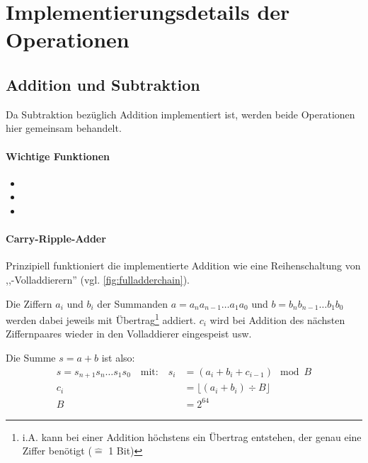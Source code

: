 
\section{Implementierungsdetails der Operationen} \label{sec:impldetails}
\subsection{Addition und Subtraktion}
    Da Subtraktion bezüglich Addition implementiert ist, werden beide Operationen hier gemeinsam behandelt.

    \paragraph*{Wichtige Funktionen}
        \begin{itemize} \tightlist
            \item {}
            \item {}
            \item {}
        \end{itemize}

    \paragraph*{Carry-Ripple-Adder}
        Prinzipiell funktioniert die implementierte Addition wie eine Reihenschaltung von ,,-Volladdierern'' (vgl. \autoref{fig:fulladderchain}).

        Die Ziffern $a_i$ und $b_i$ der Summanden $a=a_{n}a_{n-1}\dots{}a_{1}a_{0}$ und $b=b_{n}b_{n-1}\dots{}b_{1}b_{0}$ werden dabei jeweils mit Übertrag\footnote{i.A. kann bei einer Addition höchstens ein Übertrag entstehen, der genau eine Ziffer benötigt ($\hat{=}$ 1 Bit)} addiert.
        $c_i$ wird bei Addition des nächsten Ziffernpaares wieder in den Volladdierer eingespeist usw.

        Die Summe $s=a+b$ ist also:
        \begin{align*}
        s = s_{n+1}s_{n}\dots{}s_{1}s_{0} \quad
            \text{mit:} \quad
                s_i &= (a_i + b_i + c_{i-1}) \mod B \\
                c_i &= \lfloor (a_i + b_i) \div B \rfloor \\
                  B &= 2^{64}
        \end{align*}

